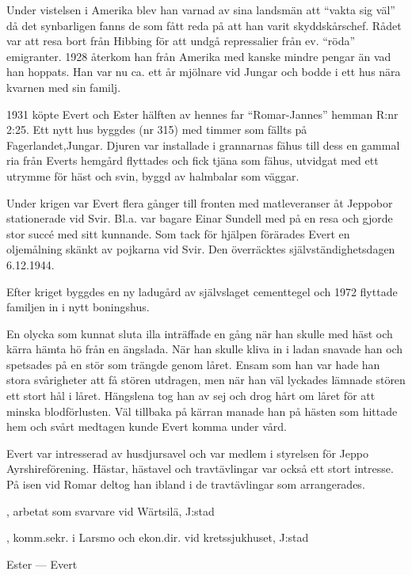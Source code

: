Under vistelsen i Amerika blev han varnad av sina landsmän att ``vakta sig väl'' då det synbarligen fanns de som fått reda på att han varit skyddskårschef. Rådet var att resa bort från Hibbing för att undgå repressalier från ev. ``röda'' emigranter. 1928 återkom han från Amerika med kanske mindre pengar än vad han hoppats. Han var nu ca. ett år mjölnare vid Jungar och bodde i ett hus nära kvarnen med sin familj.

1931 köpte Evert och Ester hälften av hennes far ``Romar-Jannes'' hemman R:nr 2:25. Ett nytt hus byggdes (nr 315) med timmer som fällts på Fagerlandet,Jungar. Djuren var installade i grannarnas fähus till dess en gammal ria från Everts hemgård flyttades och fick tjäna som fähus, utvidgat med  ett utrymme för häst och svin, byggd av halmbalar som väggar.

Under krigen var Evert flera gånger till fronten med matleveranser åt Jeppobor stationerade vid Svir. Bl.a. var bagare Einar Sundell med på en resa och gjorde stor succé med sitt kunnande. Som tack för hjälpen förärades Evert en oljemålning skänkt av pojkarna vid Svir. Den överräcktes självständighetsdagen 6.12.1944.

Efter kriget byggdes en ny ladugård av självslaget cementtegel och 1972 flyttade familjen in i nytt boningshus.

En olycka som kunnat sluta illa inträffade en gång när han skulle med häst och kärra hämta hö från en ängslada. När han skulle kliva in i ladan snavade han och spetsades på en stör som trängde genom låret. Ensam som han var hade han stora svårigheter att få stören utdragen, men när han väl lyckades lämnade stören ett stort hål i låret. Hängslena tog han av sej och drog hårt om låret för att minska blodförlusten. Väl tillbaka på kärran manade han på hästen som hittade hem och svårt medtagen kunde Evert komma under vård.

Evert var intresserad av husdjursavel och var medlem i styrelsen för Jeppo Ayrshireförening. Hästar, hästavel och travtävlingar var också ett stort intresse. På isen vid Romar deltog han ibland i de travtävlingar som arrangerades.
\begin{jhchildren}
  \item {}
  \item {}, arbetat som svarvare vid Wärtsilä, J:stad
  \item {}
  \item {}, komm.sekr. i Larsmo och ekon.dir. vid kretssjukhuset, J:stad
\end{jhchildren}
Ester   ---  Evert 



